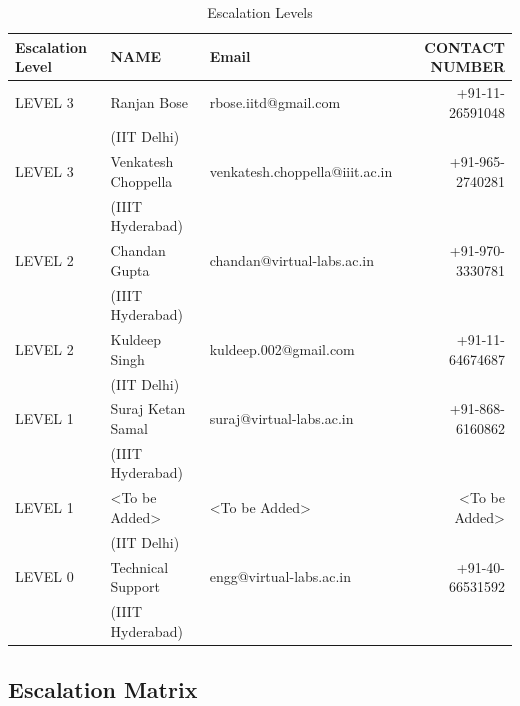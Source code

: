 \documentclass[11pt]{article}
\begin{document}
\begin{table}[H]
\caption{\label{tbl: Escalation Levels}Escalation Levels}
\begin{center}
\begin{tabular}{lllr}
\hline
 Escalation Level  &  NAME                 &  Email                           &   CONTACT NUMBER  \\
\hline
 LEVEL 3           &  Ranjan Bose          &  rbose.iitd@gmail.com            &  +91-11-26591048  \\
                   &  (IIT Delhi)          &                                  &                   \\
 LEVEL 3           &  Venkatesh Choppella  &  venkatesh.choppella@iiit.ac.in  &  +91-965-2740281  \\
                   &  (IIIT Hyderabad)     &                                  &                   \\
\hline
 LEVEL 2           &  Chandan Gupta        &  chandan@virtual-labs.ac.in      &  +91-970-3330781  \\
                   &  (IIIT Hyderabad)     &                                  &                   \\
 LEVEL 2           &  Kuldeep Singh        &  kuldeep.002@gmail.com           &  +91-11-64674687  \\
                   &  (IIT Delhi)          &                                  &                   \\
\hline
 LEVEL 1           &  Suraj Ketan Samal    &  suraj@virtual-labs.ac.in        &  +91-868-6160862  \\
                   &  (IIIT Hyderabad)     &                                  &                   \\
 LEVEL 1           &  <To be Added>        &  <To be Added>                   &    <To be Added>  \\
                   &  (IIT Delhi)          &                                  &                   \\
\hline
 LEVEL 0           &  Technical Support    &  engg@virtual-labs.ac.in         &  +91-40-66531592  \\
                   &  (IIIT Hyderabad)     &                                  &                   \\
\hline
\end{tabular}
\end{center}
\end{table}


\subsection{Escalation Matrix}
\label{sec-5.3}
\end{document}
